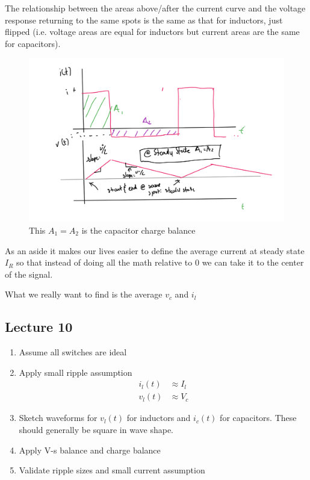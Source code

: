 \documentclass[../notes.tex]{subfiles}
\begin{document}
The relationship between the areas above/after the current curve and the voltage response returning to the same spots is the same as that for inductors, just flipped (i.e. voltage areas are equal for inductors but current areas are the same for capacitors).
\begin{figure}[H]
	\centering
	\includegraphics[width=0.8\linewidth]{img/image_2022-09-26-11-51-22.png}
	\caption{This $ A_1 = A_2 $ is the capacitor charge balance}
\end{figure}



As an aside it makes our lives easier to define the average current at steady state $ I_R $ so that instead of doing all the math relative to $ 0 $ we can take it to the center of the signal.

What we really want to find is the average $ v_c $ and $ i_l $ 





\subsection{Lecture 10}

\begin{enumerate}
	\item Assume all switches are ideal
	\item Apply small ripple assumption
		\begin{equation}
			\begin{split}
				i_l(t) &\approx I_l  \\
				v_l(t) &\approx V_c 
			\end{split}
		\end{equation}
	\item Sketch waveforms for $ v_l(t) $ for inductors and $ i_c(t) $ for capacitors. These should generally be square in wave shape.
	\item Apply V-s balance and charge balance
	\item Validate ripple sizes and small current assumption
\end{enumerate}
\end{document}
